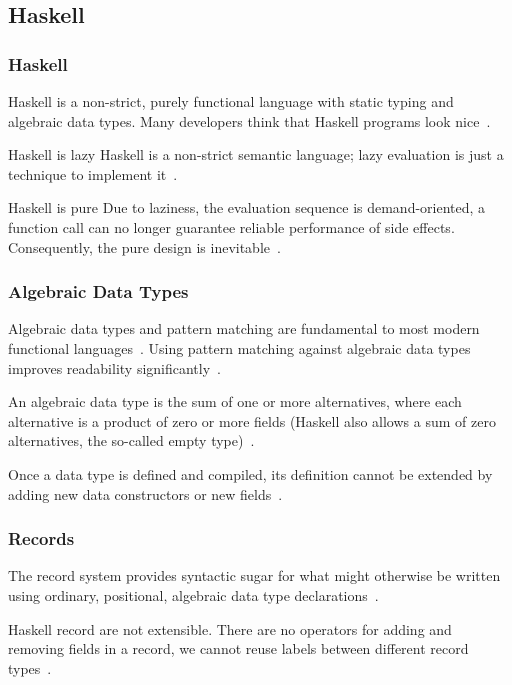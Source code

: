 \subsection{Haskell}
\begin{frame}\frametitle{Haskell}

Haskell is a non-strict, purely functional language with static typing and algebraic data types. Many developers think that Haskell programs look nice~\cite{history-of-haskell}.

\begin{block}{Haskell is lazy}
    Haskell is a non-strict semantic language; lazy evaluation is just a technique to implement it~\cite{history-of-haskell}.
\end{block}

\begin{block}{Haskell is pure}
Due to laziness, the evaluation sequence is demand-oriented, a function call can no longer guarantee reliable performance of side effects. Consequently, the pure design is inevitable~\cite{history-of-haskell}.
\end{block}

\end{frame}

\begin{frame}\frametitle{Algebraic Data Types}

Algebraic data types and pattern matching are fundamental to most modern functional languages~\cite{trees-that-grow}. Using pattern matching against algebraic data types improves readability significantly~\cite{history-of-haskell}.

An algebraic data type is the sum of one or more alternatives, where each alternative is a product of zero or more fields (Haskell also allows a sum of zero alternatives, the so-called empty type)~\cite{history-of-haskell}. 
        

Once a data type is defined and compiled, its definition cannot be extended by adding new data constructors or new fields~\cite{trees-that-grow}.

\end{frame}

\begin{frame}\frametitle{Records }

The record system provides syntactic sugar for what might otherwise be written using ordinary, positional, algebraic data type declarations~\cite{lw-ext-records}. 


Haskell record are not extensible. There are no operators for adding and removing fields in a record, we cannot reuse labels between different record types~\cite{poly-ext-records, hlist,lw-ext-records}. 

\end{frame}

